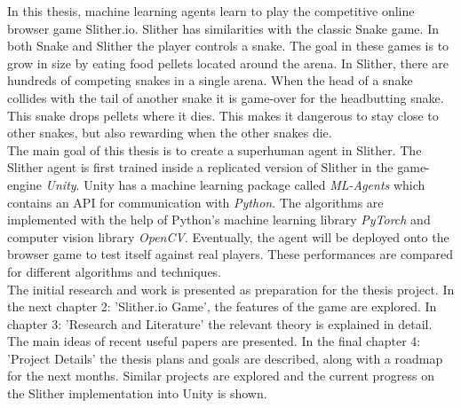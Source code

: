 In this thesis, machine learning agents learn to play the competitive online browser game Slither.io. Slither has similarities with the classic Snake game. In both Snake and Slither the player controls a snake. The goal in these games is to grow in size by eating food pellets located around the arena. In Slither, there are hundreds of competing snakes in a single arena. When the head of a snake collides with the tail of another snake it is game-over for the headbutting snake. This snake drops pellets where it dies. This makes it dangerous to stay close to other snakes, but also rewarding when the other snakes die.
\\[2.5mm]
The main goal of this thesis is to create a superhuman agent in Slither. The Slither agent is first trained inside a replicated version of Slither in the game-engine \textit{Unity}. Unity has a machine learning package called \textit{ML-Agents} which contains an API for communication with \textit{Python}. The algorithms are implemented with the help of Python's machine learning library \textit{PyTorch} and computer vision library \textit{OpenCV}. Eventually, the agent will be deployed onto the browser game to test itself against real players. These performances are compared for different algorithms and techniques.
\\[2.5mm]
The initial research and work is presented as preparation for the thesis project. In the next chapter 2: 'Slither.io Game', the features of the game are explored. In  chapter 3: 'Research and Literature' the relevant theory is explained in detail. The main ideas of recent useful papers are presented. In the final chapter 4: 'Project Details'  the thesis plans and goals are described, along with a roadmap for the next months. Similar projects are explored and the current progress on the Slither implementation into Unity is shown. 

